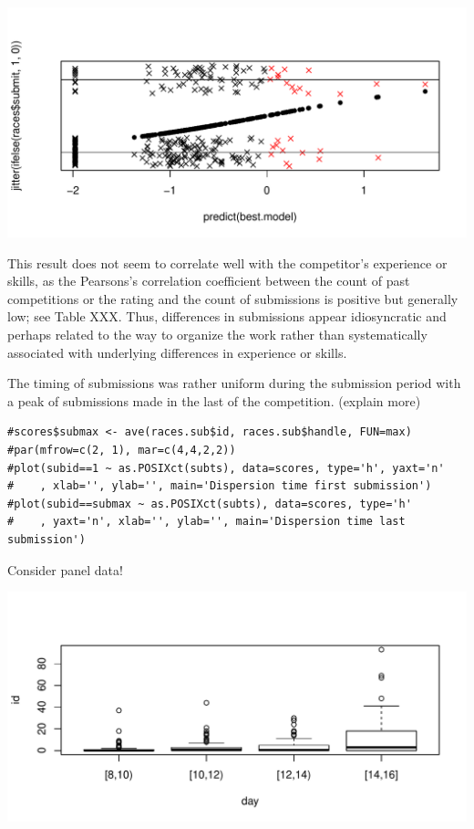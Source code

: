 \documentclass[12pt,]{article}
\begin{document}
\includegraphics{Figures/unnamed-chunk-19-1.pdf}

This result does not seem to correlate well with the competitor's
experience or skills, as the Pearsons's correlation coefficient between
the count of past competitions or the rating and the count of
submissions is positive but generally low; see Table XXX. Thus,
differences in submissions appear idiosyncratic and perhaps related to
the way to organize the work rather than systematically associated with
underlying differences in experience or skills.

The timing of submissions was rather uniform during the submission
period with a peak of submissions made in the last of the competition.
(explain more)

\begin{verbatim}
#scores$submax <- ave(races.sub$id, races.sub$handle, FUN=max)
#par(mfrow=c(2, 1), mar=c(4,4,2,2))
#plot(subid==1 ~ as.POSIXct(subts), data=scores, type='h', yaxt='n'
#    , xlab='', ylab='', main='Dispersion time first submission')
#plot(subid==submax ~ as.POSIXct(subts), data=scores, type='h'
#    , yaxt='n', xlab='', ylab='', main='Dispersion time last submission')
\end{verbatim}

Consider panel data!

\includegraphics{Figures/unnamed-chunk-21-1.pdf}
\end{document}
